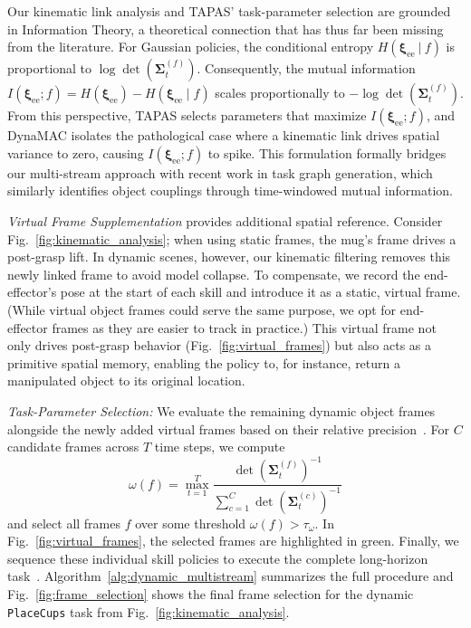 \documentclass[letterpaper, 10 pt, journal, twoside]{IEEEtran}
\renewcommand{\figref}[1]{Fig.~\ref{#1}}
\renewcommand{\algref}[1]{Algorithm~\ref{#1}}
\newcommand{\pose}{\boldsymbol{\xi}}
\newcommand{\ee}{\mathrm{ee}}
\newcommand{\ourmethod}{DynaMAC\xspace}
\begin{document}
%

Our kinematic link analysis and TAPAS' task-parameter selection are grounded in Information Theory, a theoretical connection that has thus far been missing from the literature.
For Gaussian policies, the conditional entropy $H(\pose_\ee \ |\ f)$ is proportional to $\log\det(\boldsymbol{\Sigma}_{t}^{(f)})$. 
Consequently, the mutual information $I(\pose_\ee ; f) = H(\pose_\ee) - H(\pose_\ee \mid f)$ scales proportionally to $-\log\det(\boldsymbol{\Sigma}_{t}^{(f)})$. 
%
From this perspective, TAPAS selects parameters that maximize $I(\pose_\ee ; f)$, and \ourmethod{} isolates the pathological case where a kinematic link drives spatial variance to zero, causing $I(\pose_\ee ; f)$ to spike. 
%
This formulation formally bridges our multi-stream approach with recent work in task graph generation, which similarly identifies object couplings through time-windowed mutual information\cite{merlo2025exploiting, rofer2026sparta}.

\textit{Virtual Frame Supplementation} provides additional spatial reference.
Consider \figref{fig:kinematic_analysis}; when using static frames, the mug's frame drives a post-grasp lift.
%
In dynamic scenes, however, our kinematic filtering removes this newly linked frame to avoid model collapse.
%
To compensate, we record the end-effector's pose at the start of each skill and introduce it as a static, virtual frame.
(While virtual object frames could serve the same purpose, we opt for end-effector frames as they are easier to track in practice.)
%
%
%
This virtual frame not only drives post-grasp behavior (\figref{fig:virtual_frames}) but also acts as a primitive spatial memory, enabling the policy to, for instance, return a manipulated object to its original location.

\textit{Task-Parameter Selection:} We evaluate the remaining dynamic object frames alongside the newly added virtual frames based on their relative precision~\cite{von2024art}.
For \(C\) candidate frames across \(T\) time steps, we compute
\begin{equation}\label{eq:frame_sel}
    \omega(f) = \max_{t=1}^T \frac{\det \left(\boldsymbol\Sigma_t^{(f)}\right)^{-1}}{\sum_{c=1}^C \det \left(\boldsymbol\Sigma_t^{(c)}\right)^{-1}}
\end{equation}
and select all frames \(f\) over some threshold \(\omega(f)>\tau_{\omega}\).
In \figref{fig:virtual_frames}, the selected frames are highlighted in green. 
Finally, we sequence these individual skill policies to execute the complete long-horizon task~\cite{rozo2020learning, von2024art, von2025unreasonable}.
\algref{alg:dynamic_multistream} summarizes the full procedure and \figref{fig:frame_selection} shows the final frame selection for the dynamic \texttt{PlaceCups} task from \figref{fig:kinematic_analysis}.
\end{document}
